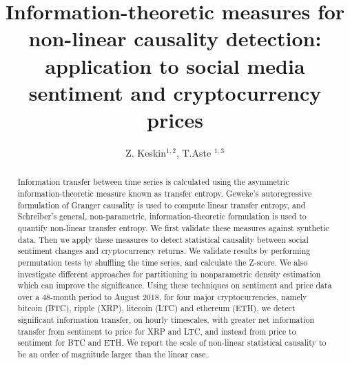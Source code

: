 \documentclass[]{rsos}%
\begin{document}
\title{Information-theoretic measures for non-linear causality detection: \\ application to social media sentiment and cryptocurrency prices}

\author{%
Z. Keskin$^{1,2}$, T.Aste $^{1,3}$}

\address{$^{1}$Department of Computer Science \& Centre for Blockchain Technologies, University College London, Gower Street, WC1E 6EA, London, United Kingdom.\\
$^{2}$Department of Physics and Astronomy, University College London, Gower Street, WC1E 6EA, London, United Kingdom.
$^3$ UCL Centre for Blockchain Technologies, University College London, London, United Kingdom.}

\subject{Information Theory, Causality, Computational Statistics, Time Series Analysis}
 


\begin{abstract}
    Information transfer between time series is calculated using the asymmetric information-theoretic measure known as transfer entropy. Geweke's autoregressive formulation of Granger causality is used to compute linear transfer entropy, and Schreiber's general, non-parametric, information-theoretic formulation is used to quantify non-linear transfer entropy. 
    We first validate these measures against synthetic data. Then we apply these measures to detect {\color{blue} statistical causality} between  social sentiment {\color{blue} changes} and cryptocurrency {\color{blue} returns}. We validate results by performing permutation tests by shuffling the time series, and calculate the Z-score. We also investigate different approaches for partitioning in nonparametric density estimation which can improve the significance. 
    Using these techniques on sentiment and price data over a 48-month period to August 2018, for four major cryptocurrencies, namely bitcoin (BTC), ripple (XRP), litecoin (LTC) and ethereum (ETH), we detect significant information transfer, on hourly timescales, with greater net information transfer from sentiment to price for XRP and LTC, and instead from price to sentiment for BTC and ETH. We report the scale of non-linear {\color{blue}statistical causality} to be an order of magnitude larger than {\color{blue}the linear case}.
\end{abstract}
\end{document}
